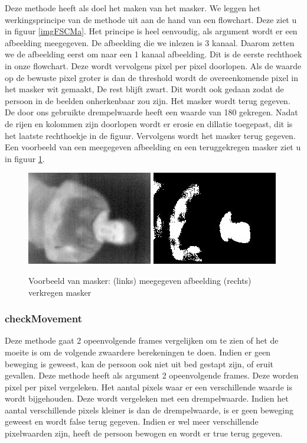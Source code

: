 Deze methode heeft als doel het maken van het masker. We leggen het werkingsprincipe van de methode uit aan de hand van een flowchart. Deze ziet u in figuur \ref{imgFSCMa}. Het principe is heel eenvoudig, als argument wordt er een afbeelding meegegeven. De afbeelding die we inlezen is 3 kanaal. Daarom zetten we de afbeelding eerst om naar een 1 kanaal afbeelding. Dit is de eerste rechthoek in onze flowchart.  Deze wordt vervolgens  pixel per pixel doorlopen. Als de waarde op de bewuste pixel groter is dan de threshold wordt de overeenkomende pixel in het masker wit gemaakt, De rest blijft zwart. Dit wordt ook gedaan zodat de persoon in de beelden onherkenbaar zou zijn. Het masker wordt terug gegeven. De door ons gebruikte drempelwaarde heeft een waarde van 180 gekregen. Nadat de rijen en kolommen zijn doorlopen wordt er erosie en dillatie toegepast, dit is het laatste rechthoekje in de figuur. Vervolgens wordt het masker terug gegeven.  Een voorbeeld van een meegegeven afbeelding en een teruggekregen masker ziet u in figuur \ref{imgCMa}.

\begin{figure}[hbp]
	\includegraphics[scale=0.75]{EersteExperiment_img0}
	\includegraphics[scale = 0.75]{EersteExperiment_mask0}
	\caption{Voorbeeld van masker: (links) meegegeven afbeelding (rechts) verkregen masker}
	\label{imgCMa}
\end{figure}

\subsubsection{checkMovement}
Deze methode gaat 2 opeenvolgende frames vergelijken om te zien of het de moeite is om de volgende zwaardere berekeningen te doen. Indien er geen beweging is geweest, kan de persoon ook niet uit bed gestapt zijn, of eruit gevallen. Deze methode heeft als argument 2 opeenvolgende frames. Deze worden pixel per pixel vergeleken. Het aantal pixels waar er een verschillende waarde is wordt bijgehouden. Deze wordt vergeleken met een drempelwaarde. Indien het aantal verschillende pixels kleiner is dan de drempelwaarde, is er geen beweging geweest en wordt false terug gegeven. Indien er wel meer verschillende pixelwaarden zijn, heeft de persoon bewogen en wordt er true terug gegeven.

